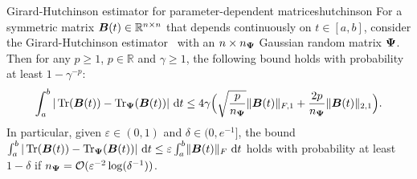 \begin{theorem}{Girard-Hutchinson estimator for parameter-dependent matrices}{hutchinson}
    For a symmetric matrix $\boldsymbol{B}(t) \in \mathbb{R}^{n \times n}$ that depends continuously on $t \in [a, b]$, consider the  Girard-Hutchinson estimator~ with an $n\times n_{\boldsymbol{\Psi}}$ Gaussian random matrix $\boldsymbol{\Psi}$. Then for any $p \geq 1$, $p \in \mathbb{R}$ and $\gamma \geq 1$, the following bound holds with probability at least $1 - \gamma^{-p}$:
    \begin{equation} \label{eq:ghbound}
        \int_{a}^{b} |\operatorname{Tr}(\boldsymbol{B}(t)) - \operatorname{Tr}_{\boldsymbol{\Psi}}(\boldsymbol{B}(t))|~\mathrm{d}t \leq 4 \gamma \Big( \sqrt{\frac{p}{n_{\boldsymbol{\Psi}}}}  \|\boldsymbol{B}(t)\|_{F,1} + \frac{2 p}{n_{\boldsymbol{\Psi}}} \|\boldsymbol{B}(t)\|_{2,1} \Big).
    \end{equation}
In particular, given $\varepsilon \in (0, 1)$ and $\delta \in (0, e^{-1}]$, the bound $\int_{a}^{b} | \operatorname{Tr}(\boldsymbol{B}(t)) - \operatorname{Tr}_{\boldsymbol{\Psi}}(\boldsymbol{B}(t)) | ~\mathrm{d}t \leq \varepsilon \int_{a}^{b} \lVert \boldsymbol{B}(t) \rVert _F~\mathrm{d}t$ holds 
    with probability at least $1-\delta$ if $n_{\boldsymbol{\Psi}} = \mathcal{O}(\varepsilon^{-2} \log(\delta^{-1}))$.
\end{theorem}
